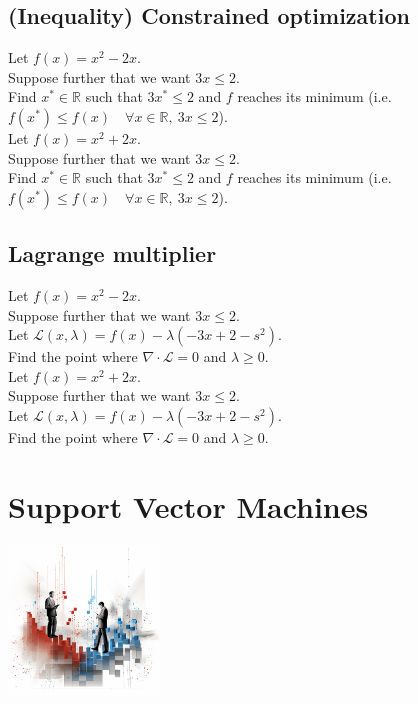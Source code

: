 \documentclass[]{article}
\newcommand{\R}{\mathbb{R}}
\begin{document}
	\subsection{(Inequality) Constrained optimization}
	Let $f(x) = x^2-2x$.\\
	Suppose further that we want $3x \leq 2$.\\
	Find $x^* \in \R$ such that $3x^* \leq 2$ and $f$ reaches its minimum (i.e. $f(x^*) \leq f(x) \quad \forall x \in \R,\ 3x \leq 2$).
	\vspace{0.5cm}
	\\
	Let $f(x) = x^2+2x$.\\
	Suppose further that we want $3x \leq 2$.\\
	Find $x^* \in \R$ such that $3x^* \leq 2$ and $f$ reaches its minimum (i.e. $f(x^*) \leq f(x) \quad \forall x \in \R,\ 3x \leq 2$).
	
	\subsection{Lagrange multiplier}
	Let $f(x) = x^2-2x$.\\
	Suppose further that we want $3x \leq 2$.\\
	Let $\mathcal{L}(x,\lambda) = f(x) - \lambda (-3x + 2 - s^2)$.\\
	Find the point where $\nabla \cdot \mathcal{L} = 0$ and $\lambda \geq 0$.
	\vspace{0.5cm}
	\\
	Let $f(x) = x^2+2x$.\\
	Suppose further that we want $3x \leq 2$.\\
	Let $\mathcal{L}(x,\lambda) = f(x) - \lambda (-3x + 2 - s^2)$.\\
	Find the point where $\nabla \cdot \mathcal{L} = 0$ and $\lambda \geq 0$.
	
	
	
	
	
	\section{Support Vector Machines}
	\begin{center}
		\includegraphics[height=4cm]{SVM_illustration}
	\end{center}
	
\end{document}
